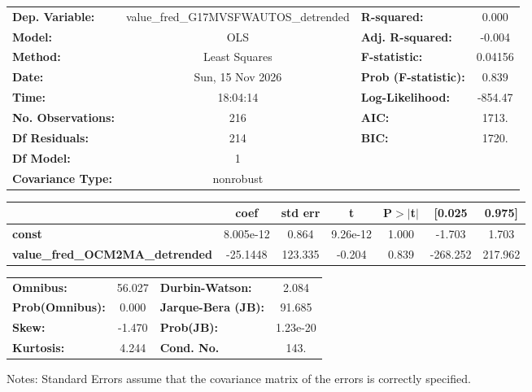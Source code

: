 \begin{center}
\begin{tabular}{lclc}
\toprule
\textbf{Dep. Variable:}                 & value\_fred\_G17MVSFWAUTOS\_detrended & \textbf{  R-squared:         } &     0.000   \\
\textbf{Model:}                         &                  OLS                  & \textbf{  Adj. R-squared:    } &    -0.004   \\
\textbf{Method:}                        &             Least Squares             & \textbf{  F-statistic:       } &   0.04156   \\
\textbf{Date:}                          &            Sun, 15 Nov 2026           & \textbf{  Prob (F-statistic):} &    0.839    \\
\textbf{Time:}                          &                18:04:14               & \textbf{  Log-Likelihood:    } &   -854.47   \\
\textbf{No. Observations:}              &                    216                & \textbf{  AIC:               } &     1713.   \\
\textbf{Df Residuals:}                  &                    214                & \textbf{  BIC:               } &     1720.   \\
\textbf{Df Model:}                      &                      1                & \textbf{                     } &             \\
\textbf{Covariance Type:}               &               nonrobust               & \textbf{                     } &             \\
\bottomrule
\end{tabular}
\begin{tabular}{lcccccc}
                                        & \textbf{coef} & \textbf{std err} & \textbf{t} & \textbf{P$> |$t$|$} & \textbf{[0.025} & \textbf{0.975]}  \\
\midrule
\textbf{const}                          &    8.005e-12  &        0.864     &  9.26e-12  &         1.000        &       -1.703    &        1.703     \\
\textbf{value\_fred\_OCM2MA\_detrended} &     -25.1448  &      123.335     &    -0.204  &         0.839        &     -268.252    &      217.962     \\
\bottomrule
\end{tabular}
\begin{tabular}{lclc}
\textbf{Omnibus:}       & 56.027 & \textbf{  Durbin-Watson:     } &    2.084  \\
\textbf{Prob(Omnibus):} &  0.000 & \textbf{  Jarque-Bera (JB):  } &   91.685  \\
\textbf{Skew:}          & -1.470 & \textbf{  Prob(JB):          } & 1.23e-20  \\
\textbf{Kurtosis:}      &  4.244 & \textbf{  Cond. No.          } &     143.  \\
\bottomrule
\end{tabular}
\end{center}

Notes: \newline
 [1] Standard Errors assume that the covariance matrix of the errors is correctly specified.